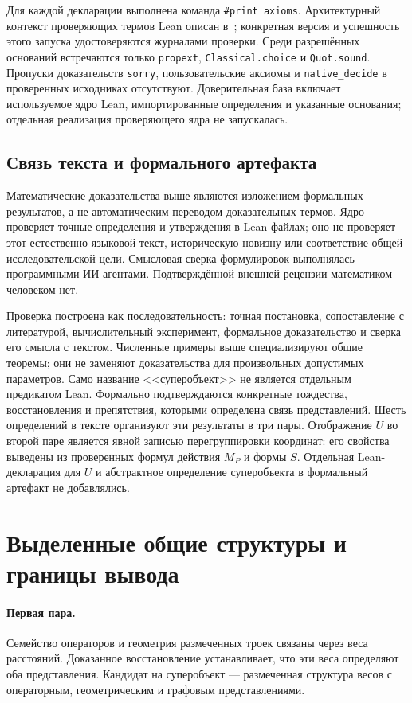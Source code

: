 \documentclass[11pt,a4paper]{article}
\numberwithin{equation}{section}
\theoremstyle{definition}
\theoremstyle{remark}
\begin{document}
Для каждой декларации выполнена команда \texttt{\#print axioms}.
Архитектурный контекст проверяющих термов Lean описан в~\cite{demoura};
конкретная версия и успешность этого запуска удостоверяются журналами проверки.
Среди разрешённых оснований встречаются только
\texttt{propext}, \texttt{Classical.choice} и \texttt{Quot.sound}.
Пропуски доказательств \texttt{sorry}, пользовательские аксиомы
и \texttt{native\_decide} в проверенных исходниках отсутствуют.
Доверительная база включает используемое ядро Lean, импортированные
определения и указанные основания; отдельная реализация проверяющего
ядра не запускалась.

\subsection{Связь текста и формального артефакта}
Математические доказательства выше являются изложением формальных
результатов, а не автоматическим переводом доказательных термов.
Ядро проверяет точные определения и утверждения в Lean-файлах;
оно не проверяет этот естественно-языковой текст, историческую
новизну или соответствие общей исследовательской цели.
Смысловая сверка формулировок выполнялась программными ИИ-агентами.
Подтверждённой внешней рецензии математиком-человеком нет.

Проверка построена как последовательность: точная постановка,
сопоставление с литературой, вычислительный эксперимент,
формальное доказательство и сверка его смысла с текстом.
Численные примеры выше специализируют общие теоремы; они не
заменяют доказательства для произвольных допустимых параметров.
Само название <<суперобъект>> не является отдельным предикатом Lean.
Формально подтверждаются конкретные тождества, восстановления
и препятствия, которыми определена связь представлений.
Шесть определений в тексте организуют эти результаты в три пары.
Отображение $U$ во второй паре является явной записью перегруппировки
координат: его свойства выведены из проверенных формул действия
$M_P$ и формы $S$. Отдельная Lean-декларация для $U$ и абстрактное
определение суперобъекта в формальный артефакт не добавлялись.

\section{Выделенные общие структуры и границы вывода}
\paragraph{Первая пара.}
Семейство операторов и геометрия размеченных троек связаны через
веса расстояний. Доказанное восстановление устанавливает, что эти
веса определяют оба представления. Кандидат на суперобъект ---
размеченная структура весов с операторным, геометрическим
и графовым представлениями.
\end{document}
